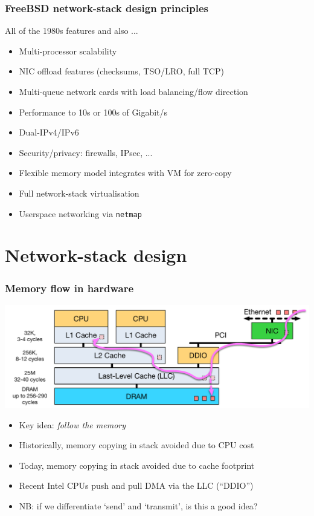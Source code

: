 \begin{frame}
  \frametitle{FreeBSD network-stack design principles}

  All of the 1980s features and also ...
  \bigskip

  \begin{itemize}
    \item Multi-processor scalability
    \item NIC offload features (checksums, TSO/LRO, full TCP)
    \item Multi-queue network cards with load balancing/flow direction
    \item Performance to 10s or 100s of Gigabit/s
    \item Dual-IPv4/IPv6
    \item Security/privacy: firewalls, IPsec, ...
    \item Flexible memory model integrates with VM for zero-copy
    \item Full network-stack virtualisation
    \item Userspace networking via \texttt{netmap}
  \end{itemize}
\end{frame}

\section{Network-stack design}

\begin{frame}
  \frametitle{Memory flow in hardware}

  \begin{center}
  \includegraphics[scale=0.5]{../../figures/network-cpu-ddio-nic.pdf}
  \end{center}

  \smallskip

  \begin{itemize}
    \item Key idea: \textit{follow the memory}

    \pause
    \medskip

    \item Historically, memory copying in stack avoided due to CPU cost
    \item Today, memory copying in stack avoided due to cache footprint

    \pause
    \medskip

    \item Recent Intel CPUs push and pull DMA via the LLC (``DDIO'')
    \item NB: if we differentiate `send' and `transmit', is this a good idea?
  \end{itemize}
\end{frame}

